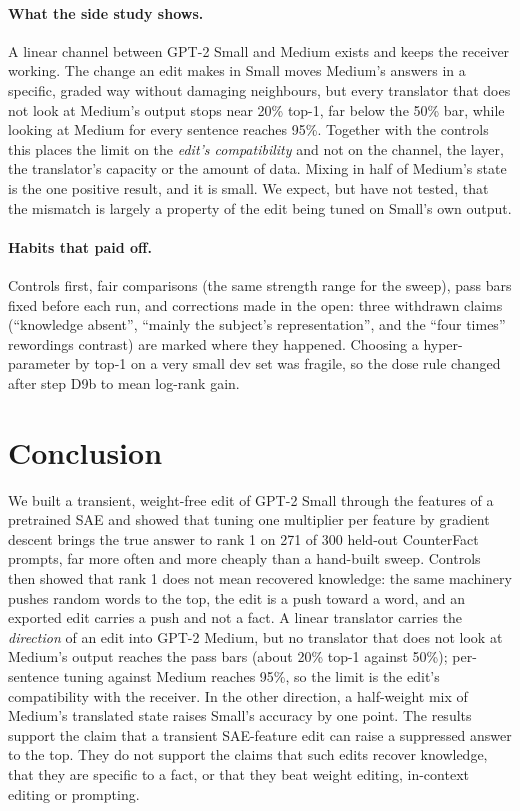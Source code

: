 \documentclass[11pt,twocolumn]{article}
\begin{document}
\paragraph{What the side study shows.} A linear channel between GPT-2 Small and Medium exists and keeps the receiver working. The change an edit makes in Small moves Medium's answers in a specific, graded way without damaging neighbours, but every translator that does not look at Medium's output stops near 20\% top-1, far below the 50\% bar, while looking at Medium for every sentence reaches 95\%. Together with the controls this places the limit on the \emph{edit's compatibility} and not on the channel, the layer, the translator's capacity or the amount of data. Mixing in half of Medium's state is the one positive result, and it is small. We expect, but have not tested, that the mismatch is largely a property of the edit being tuned on Small's own output.

\paragraph{Habits that paid off.} Controls first, fair comparisons (the same strength range for the sweep), pass bars fixed before each run, and corrections made in the open: three withdrawn claims (``knowledge absent'', ``mainly the subject's representation'', and the ``four times'' rewordings contrast) are marked where they happened. Choosing a hyper-parameter by top-1 on a very small dev set was fragile, so the dose rule changed after step D9b to mean log-rank gain.

\section{Conclusion}
\label{sec:conclusion}

We built a transient, weight-free edit of GPT-2 Small through the features of a pretrained SAE and showed that tuning one multiplier per feature by gradient descent brings the true answer to rank 1 on 271 of 300 held-out CounterFact prompts, far more often and more cheaply than a hand-built sweep. Controls then showed that rank 1 does not mean recovered knowledge: the same machinery pushes random words to the top, the edit is a push toward a word, and an exported edit carries a push and not a fact. A linear translator carries the \emph{direction} of an edit into GPT-2 Medium, but no translator that does not look at Medium's output reaches the pass bars (about 20\% top-1 against 50\%); per-sentence tuning against Medium reaches 95\%, so the limit is the edit's compatibility with the receiver. In the other direction, a half-weight mix of Medium's translated state raises Small's accuracy by one point. The results support the claim that a transient SAE-feature edit can raise a suppressed answer to the top. They do not support the claims that such edits recover knowledge, that they are specific to a fact, or that they beat weight editing, in-context editing or prompting.
\end{document}

